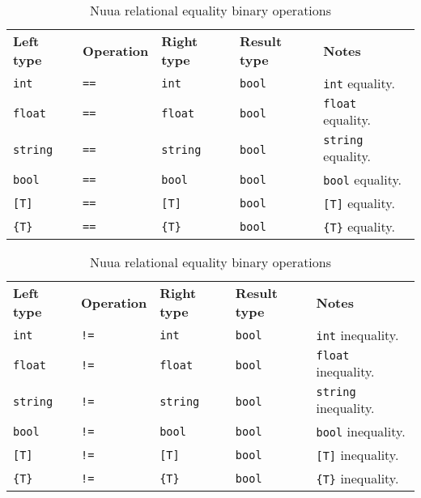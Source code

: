 \begin{table}[H]
	\centering
	\begin{subtable}{\textwidth}
		\centering
        \begin{tabular}{ l l l l p{9.5cm} }
            \textbf{Left type} & \textbf{Operation} & \textbf{Right type} & \textbf{Result type} & \textbf{Notes} \\
            \texttt{int} & \texttt{==} & \texttt{int} & \texttt{bool} & \texttt{int} equality.\\
            \texttt{float} & \texttt{==} & \texttt{float} & \texttt{bool} & \texttt{float} equality.\\
            \texttt{string} & \texttt{==} & \texttt{string} & \texttt{bool} & \texttt{string} equality.\\
            \texttt{bool} & \texttt{==} & \texttt{bool} & \texttt{bool} & \texttt{bool} equality.\\
            \texttt{[T]} & \texttt{==} & \texttt{[T]} & \texttt{bool} & \texttt{[T]} equality.\\
            \texttt{\{T\}} & \texttt{==} & \texttt{\{T\}} & \texttt{bool} & \texttt{\{T\}} equality.\\
		\end{tabular}
		\caption{Equality}
	\end{subtable}
	\begin{subtable}{\textwidth}
		\centering
        \begin{tabular}{ l l l l p{9.5cm} }
            \textbf{Left type} & \textbf{Operation} & \textbf{Right type} & \textbf{Result type} & \textbf{Notes} \\
            \texttt{int} & \texttt{!=} & \texttt{int} & \texttt{bool} & \texttt{int} inequality.\\
            \texttt{float} & \texttt{!=} & \texttt{float} & \texttt{bool} & \texttt{float} inequality.\\
            \texttt{string} & \texttt{!=} & \texttt{string} & \texttt{bool} & \texttt{string} inequality.\\
            \texttt{bool} & \texttt{!=} & \texttt{bool} & \texttt{bool} & \texttt{bool} inequality.\\
            \texttt{[T]} & \texttt{!=} & \texttt{[T]} & \texttt{bool} & \texttt{[T]} inequality.\\
            \texttt{\{T\}} & \texttt{!=} & \texttt{\{T\}} & \texttt{bool} & \texttt{\{T\}} inequality.\\
		\end{tabular}
		\caption{Inequality}
	\end{subtable}
	\caption{Nuua relational equality binary operations}
    \label{fig:nuua_relational_equality_bin_ops}
\end{table}

